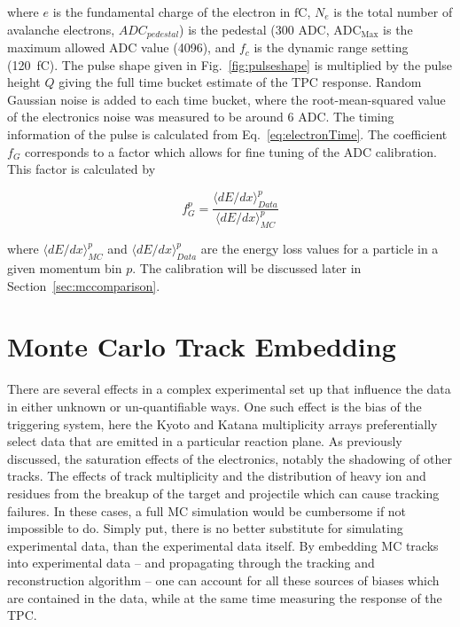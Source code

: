 where $e$ is the fundamental charge of the electron in $\si{\femto \coulomb}$, $N_{e}$ is the total number of avalanche electrons, $ADC_{pedestal}$) is the pedestal (300 ADC, $\mathrm{ADC_{Max}}$ is the maximum allowed ADC value (4096), and $f_c$ is the dynamic range setting (\SI{120}{\femto\coulomb}). The pulse shape given in Fig.~\ref{fig:pulseshape} is multiplied by the pulse height $Q$ giving the full time bucket estimate of the TPC response. Random Gaussian noise is added to each time bucket, where the root-mean-squared value of the electronics noise was measured to be around 6 ADC. The timing information of the pulse is calculated from Eq.~\ref{eq:electronTime}. The coefficient $f_G$ corresponds to a factor which allows for fine tuning of the ADC calibration. This factor is calculated by

\begin{equation}
f_G^p = \frac{\langle dE/dx\rangle_{Data}^p}{\langle dE/dx\rangle_{MC}^p}
\label{eq:dedxcalibration}
\end{equation}

where $\langle dE/dx\rangle_{MC}^p$ and $\langle dE/dx\rangle_{Data}^p$  are the energy loss values for a particle in a given momentum bin $p$. The calibration will be discussed later in Section~\ref{sec:mccomparison}.


\section{Monte Carlo Track Embedding}
\label{sec:embedding}

There are several effects in a complex experimental set up that influence the data in either unknown or un-quantifiable ways. One such effect is the bias of the triggering system, here the Kyoto and Katana multiplicity arrays preferentially select data that are emitted in a particular reaction plane. As previously discussed, the saturation effects of the electronics, notably the shadowing of other tracks. The effects of track multiplicity and the distribution of heavy ion and residues from the breakup of the target and projectile which can cause tracking failures. In these cases, a full MC simulation would be cumbersome if not impossible to do. Simply put, there is no better substitute for simulating experimental data, than the experimental data itself. By embedding MC tracks into experimental data -- and propagating through the tracking and reconstruction algorithm -- one can account for all these sources of biases which are contained in the data, while at the same time measuring the response of the TPC.

